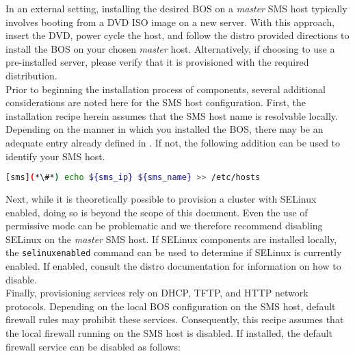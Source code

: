 In an external setting, installing the desired BOS on a
{\em master} SMS host typically involves booting from a DVD ISO image on a new
server. With this approach, insert the \baseOS{} DVD, power cycle the host, and
follow the distro provided directions to install the BOS on your chosen {\em
master} host.  Alternatively, if choosing to use a pre-installed server, please
verify that it is provisioned with the required \baseOS{} distribution. \\

Prior to beginning the installation process of \OHPC{} components, several additional
considerations are noted here for the SMS host configuration. First, 
the installation recipe herein assumes that
the SMS host name is resolvable locally. Depending on the manner in which you
installed the BOS, there may be an adequate entry already defined
in . If not, the following addition can be used to identify
your SMS host.
\begin{lstlisting}[language=bash,keywords={}]
[sms](*\#*) echo ${sms_ip} ${sms_name} >> /etc/hosts
\end{lstlisting}

Next, while it is theoretically possible to provision a \provisioner{} cluster with SELinux
enabled, doing so is beyond the scope of this document. Even the use of
permissive mode can be problematic and we therefore recommend disabling SELinux on the {\em
master} SMS host. If SELinux components are installed locally,
the \texttt{selinuxenabled} command can be used to determine if SELinux is
currently enabled. If enabled, consult the distro documentation for information
on how to disable. \\

Finally, provisioning services rely on DHCP, TFTP, and HTTP network protocols.
Depending on the local BOS configuration on the SMS host, default firewall
rules may prohibit these services. Consequently, this recipe assumes that the local
firewall running on the SMS host is disabled. If installed, the default
firewall service can be disabled as follows:
